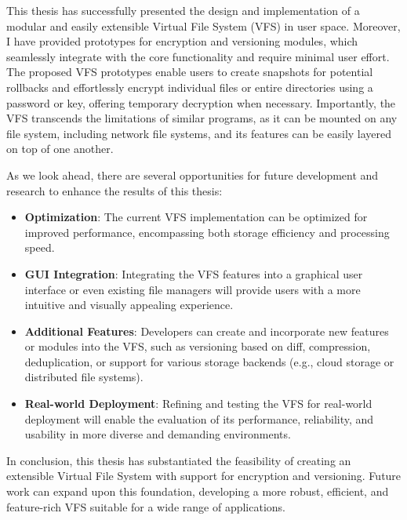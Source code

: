 
This thesis has successfully presented the design and implementation of a modular and easily extensible Virtual File System (VFS) in user space.
Moreover, I have provided prototypes for encryption and versioning modules, which seamlessly integrate with the core functionality and require minimal user effort.
The proposed VFS prototypes enable users to create snapshots for potential rollbacks and effortlessly encrypt individual files or entire directories using a password or key, offering temporary decryption when necessary.
Importantly, the VFS transcends the limitations of similar programs, as it can be mounted on any file system, including network file systems, and its features can be easily layered on top of one another.

As we look ahead, there are several opportunities for future development and research to enhance the results of this thesis:

\begin{itemize}
    \item \textbf{Optimization}: The current VFS implementation can be optimized for improved performance, encompassing both storage efficiency and processing speed.
    \item \textbf{GUI Integration}: Integrating the VFS features into a graphical user interface or even existing file managers will provide users with a more intuitive and visually appealing experience.
    \item \textbf{Additional Features}: Developers can create and incorporate new features or modules into the VFS, such as versioning based on diff, compression, deduplication, or support for various storage backends (e.g., cloud storage or distributed file systems).
    \item \textbf{Real-world Deployment}: Refining and testing the VFS for real-world deployment will enable the evaluation of its performance, reliability, and usability in more diverse and demanding environments.
\end{itemize}

In conclusion, this thesis has substantiated the feasibility of creating an extensible Virtual File System with support for encryption and versioning.
Future work can expand upon this foundation, developing a more robust, efficient, and feature-rich VFS suitable for a wide range of applications.